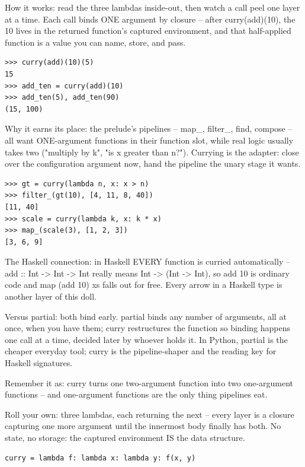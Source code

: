 \documentclass[10pt,letterpaper]{book}
\begin{document}
How it works: read the three lambdas inside-out, then watch a call peel one layer at a time. Each call binds ONE argument by closure -- after curry(add)(10), the 10 lives in the returned function's captured environment, and that half-applied function is a value you can name, store, and pass.

\begin{lstlisting}[style=ex]
>>> curry(add)(10)(5)
15
>>> add_ten = curry(add)(10)
>>> add_ten(5), add_ten(90)
(15, 100)
\end{lstlisting}

Why it earns its place: the prelude's pipelines -- map\_, filter\_, find, compose -- all want ONE-argument functions in their function slot, while real logic usually takes two ("multiply by k", "is x greater than n?"). Currying is the adapter: close over the configuration argument now, hand the pipeline the unary stage it wants.

\begin{lstlisting}[style=ex]
>>> gt = curry(lambda n, x: x > n)
>>> filter_(gt(10), [4, 11, 8, 40])
[11, 40]
>>> scale = curry(lambda k, x: k * x)
>>> map_(scale(3), [1, 2, 3])
[3, 6, 9]
\end{lstlisting}

The Haskell connection: in Haskell EVERY function is curried automatically -- add :: Int -> Int -> Int really means Int -> (Int -> Int), so add 10 is ordinary code and map (add 10) xs falls out for free. Every arrow in a Haskell type is another layer of this doll.


Versus partial: both bind early. partial binds any number of arguments, all at once, when you have them; curry restructures the function so binding happens one call at a time, decided later by whoever holds it. In Python, partial is the cheaper everyday tool; curry is the pipeline-shaper and the reading key for Haskell signatures.


Remember it as: curry turns one two-argument function into two one-argument functions -- and one-argument functions are the only thing pipelines eat.


Roll your own: three lambdas, each returning the next -- every layer is a closure capturing one more argument until the innermost body finally has both. No state, no storage: the captured environment IS the data structure.

\begin{lstlisting}[style=ex]
curry = lambda f: lambda x: lambda y: f(x, y)
\end{lstlisting}
\end{document}
